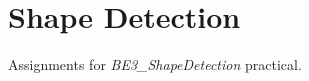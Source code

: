 \section{Shape Detection}
\label{sec:shape_detection}

Assignments for \textit{BE3\_ShapeDetection} practical.